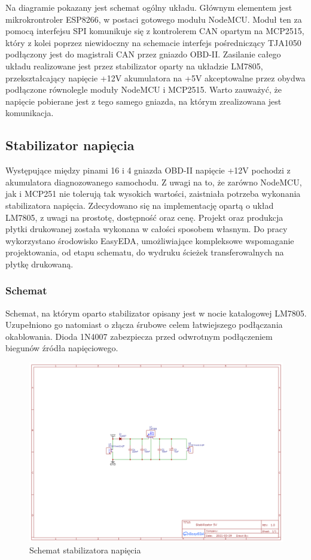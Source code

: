 \documentclass[10pt,a4paper]{article}
\begin{document}
	Na diagramie pokazany jest schemat ogólny układu. Głównym elementem jest mikrokrontroler ESP8266, w postaci gotowego modułu NodeMCU. Moduł ten za pomocą interfejsu SPI komunikuje się z kontrolerem CAN opartym na MCP2515, który z kolei poprzez niewidoczny na schemacie interfejs pośredniczący TJA1050 podłączony jest do magistrali CAN przez gniazdo OBD-II. Zasilanie całego układu realizowane jest przez stabilizator oparty na układzie LM7805, przekształcający napięcie +12V akumulatora na +5V akceptowalne przez obydwa podłączone równolegle moduły NodeMCU i MCP2515. Warto zauważyć, że napięcie pobierane jest z tego samego gniazda, na którym zrealizowana jest komunikacja.
		\subsection{Stabilizator napięcia}
		Występujące między pinami 16 i 4 gniazda OBD-II napięcie +12V pochodzi z akumulatora diagnozowanego samochodu. Z uwagi na to, że zarówno NodeMCU, jak i MCP251 nie tolerują tak wysokich wartości, zaistniała potrzeba wykonania stabilizatora napięcia. Zdecydowano się na implementację opartą o układ LM7805, z uwagi na prostotę, dostępność oraz cenę. Projekt oraz produkcja płytki drukowanej została wykonana w całości sposobem własnym. Do pracy wykorzystano środowisko EasyEDA, umożliwiające kompleksowe wspomaganie projektowania, od etapu schematu, do wydruku ścieżek transferowalnych na płytkę drukowaną.
		\subsubsection{Schemat}
		Schemat, na którym oparto stabilizator opisany jest w nocie katalogowej LM7805. Uzupełniono go natomiast o złącza śrubowe celem łatwiejszego podłączania okablowania. Dioda 1N4007 zabezpiecza przed odwrotnym podłączeniem biegunów źródła napięciowego.
		\begin{figure}
			\centering
			\includegraphics[width=1.0\linewidth]{schemat_stabilizator}
			\caption{Schemat stabilizatora napięcia}
			\label{fig:schematstabilizator}
		\end{figure}\\
\end{document}

